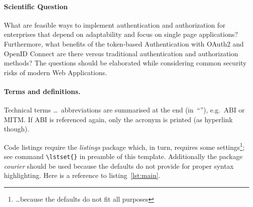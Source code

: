 \paragraph{Scientific Question}
What are feasible ways to implement authentication and authorization for enterprises that depend on adaptability and focus on single page applications? Furthermore, what benefits of the token-based Authentication with OAuth2 and OpenID Connect are there versus traditional authentication and authorization methods? The questions should be elaborated while considering common security risks of modern Web Applications.


\paragraph{Terms and definitions.}
Technical terms \ldots\ abbreviations are summarised at the end (in~``''), e.g.\ \ac{ABI} or \ac{MITM}. If \ac{ABI} is referenced again, only the acronym is printed (as hyperlink though).

Code listings require the \textit{listings} package which, in turn, requires some settings\footnote{\ldots because the defaults do not fit all purposes}; see command \verb+\lstset{}+ in preamble of this template. Additionally the package \textit{courier} should be used because the defaults do not provide for proper syntax highlighting. Here is a reference to listing~\ref{lst:main}.


\chapterend
